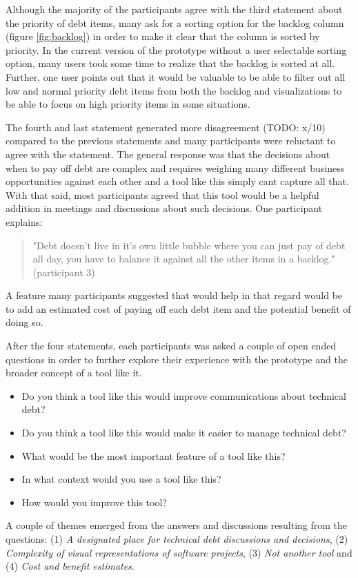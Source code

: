 Although the majority of the participants agree with the third statement about the priority of debt items, many ask for a sorting option for the backlog column (figure \ref{fig:backlog}) in order to make it clear that the column is sorted by priority.
In the current version of the prototype without a user selectable sorting option, many users took some time to realize that the backlog is sorted at all.
Further, one user points out that it would be valuable to be able to filter out all low and normal priority debt items from both the backlog and visualizations to be able to focus on high priority items in some situations.

The fourth and last statement generated more disagreement (TODO: x/10) compared to the previous statements and many participants were reluctant to agree with the statement.
The general response was that the decisions about when to pay off debt are complex and requires weighing many different business opportunities against each other and a tool like this simply cant capture all that.
With that said, most participants agreed that this tool would be a helpful addition in meetings and discussions about such decisions.
One participant explains:
\begin{quote}
  "Debt doesn't live in it's own little bubble where you can just pay of debt all day, you have to balance it against all the other items in a backlog." (participant 3)
\end{quote}
A feature many participants suggested that would help in that regard would be to add an estimated cost of paying off each debt item and the potential benefit of doing so.

After the four statements, each participants was asked a couple of open ended questions in order to further explore their experience with the prototype and the broader concept of a tool like it.

\smallskip
\begin{itemize}
  \item Do you think a tool like this would improve communications about technical debt?
  \item Do you think a tool like this would make it easier to manage technical debt?
  \item What would be the most important feature of a tool like this?
  \item In what context would you use a tool like this?
  \item How would you improve this tool?
\end{itemize}
\smallskip

A couple of themes emerged from the answers and discussions resulting from the questions: (1) \textit{A designated place for technical debt discussions and decisions}, (2) \textit{Complexity of visual representations of software projects}, (3) \textit{Not another tool} and (4) \textit{Cost and benefit estimates}.

